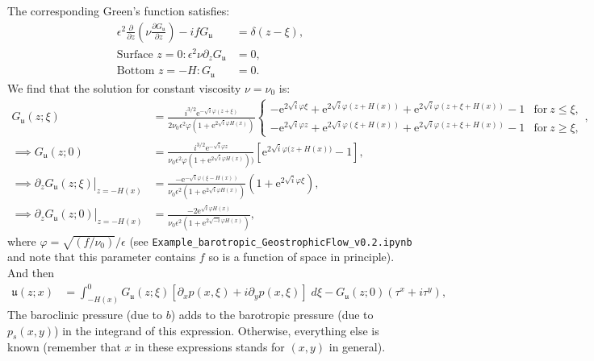 \documentclass[10pt]{amsart}
\begin{document}
The corresponding Green's function satisfies:
\begin{align}
\epsilon^2 \frac{\partial}{\partial z} \left( \nu  \frac{\partial G_\mathfrak{u}}{\partial z} \right)  - i f  G_\mathfrak{u} & = \delta(z - \xi) ,  \\
\text{Surface~}z = 0:
\epsilon^2 \nu \partial_z G_\mathfrak{u} & = 0 ,
 \\
\text{Bottom~}z = -H:
G_\mathfrak{u} & = 0 .
\end{align}
We find that the solution for constant viscosity $\nu = \nu_0$ is:  
\begin{align}
 G_{ \mathfrak{u}}(z;\xi) & = 
\frac{ i^{3/2} \mathrm{e}^{- \sqrt{i} \varphi (z + \xi)} }{2  \nu_0 \epsilon^2 \varphi  \left(1 + \mathrm{e}^{2 \sqrt{i} \varphi H \left(x \right)} \right)}
\begin{cases} 
\displaystyle - \mathrm{e}^{2 \sqrt{i} \varphi \xi} + \mathrm{e}^{2 \sqrt{i} \varphi \left( z + H(x)\right)} + \mathrm{e}^{2 \sqrt{i} \varphi \left( z + \xi + H(x)\right)} - 1
 & \text{for}\: z \leq \xi , \\
\displaystyle - \mathrm{e}^{2 \sqrt{i} \varphi z} + \mathrm{e}^{2 \sqrt{i} \varphi \left( \xi + H(x)\right)} + \mathrm{e}^{2 \sqrt{i} \varphi \left( z + \xi + H(x)\right)} - 1
 & \text{for}\: z \geq \xi ,
\end{cases} , \label{eqn:FG_Gsfn} \\
\implies  G_{ \mathfrak{u}}(z;0) & = 
\frac{ i^{3/2} \mathrm{e}^{- \sqrt{i} \varphi z } }{ \nu_0 \epsilon^2 \varphi  \left(1 + \mathrm{e}^{2 \sqrt{i} \varphi H \left(x \right)} \right))}
\left[ \mathrm{e}^{2 \sqrt{i} \varphi ( z  + H{\left(x \right))}} - 1 \right] , \nonumber \\
\implies \partial_z \left. G_{ \mathfrak{u}}(z;\xi) \right|_{z = -H(x)} & = 
\frac{- \mathrm{e}^{-\sqrt{i} \varphi (\xi - H(x))  } }{ \nu_0 \epsilon^2 \left(1 + \mathrm{e}^{2 \sqrt{i} \varphi H \left(x \right)} \right)}
\left( 1 + \mathrm{e}^{2 \sqrt{i} \varphi \xi}\right) , \label{eqn:FG_Gsfn_bottom_deriv} \\
\implies \partial_z \left. G_{ \mathfrak{u}}(z;0) \right|_{z = -H(x)} & = 
\frac{- 2 \mathrm{e}^{\sqrt{i} \varphi H(x)  } }{ \nu_0 \epsilon^2 \left(1 + \mathrm{e}^{2 \sqrt{-i} \varphi H \left(x \right)} \right)}
 , \label{eqn:FG_Gsfn_bottom_deriv_top}
\end{align}
where $\varphi = \sqrt{\left( f / \nu_0 \right) } / \epsilon$ (see \texttt{Example\_barotropic\_GeostrophicFlow\_v0.2.ipynb} and note that this parameter contains $f$ so is a function of space in principle).
And then 
\begin{align}
\mathfrak{u} (z;x) & = \int_{-H(x)}^{0} G_{ \mathfrak{u}} (z; \xi) \left[ \partial_x p( x, \xi) + i \partial_y p( x, \xi) \right] \; d \xi 
 -   G_{\mathfrak{u}} (z; 0)  \left( \tau^x + i \tau^y \right)  ,
\end{align}
The baroclinic pressure (due to $b$) adds to the barotropic pressure (due to $p_s(x,y)$) in the integrand of this expression. 
Otherwise, everything else is known (remember that $x$ in these expressions stands for $(x,y)$ in general).
\end{document}

